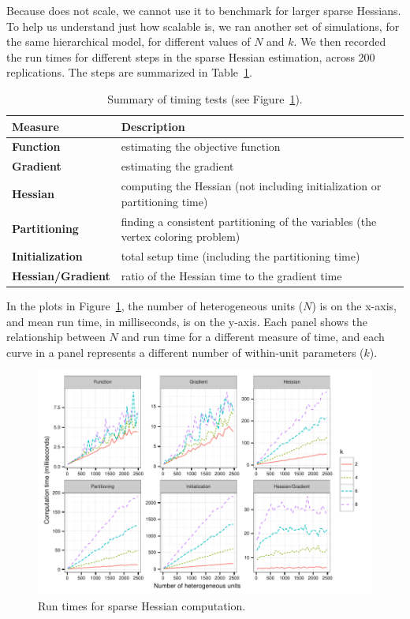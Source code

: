 \documentclass[article]{jss}\usepackage[]{graphicx}\usepackage[]{color}
\begin{document}
Because  does not scale, we cannot use it to benchmark  for
larger sparse Hessians.  To help us understand just how scalable
 is, we ran another set of simulations, for the
same hierarchical model, for different values of $N$ and $k$.  We then
recorded the run times for different steps in the sparse Hessian
estimation, across 200 replications.  The steps are summarized in Table~\ref{tab:timeMeasures}.

\begin{table}[ptb]\centering
  \begin{tabularx}{1.0\linewidth}{>{\bfseries}l X}
    \toprule
    Measure&Description\\
    \midrule
Function&estimating the objective function\\
Gradient&estimating the gradient\\
Hessian&computing the Hessian (not including initialization or
  partitioning time)\\
Partitioning&finding a consistent partitioning of the
  variables (the vertex coloring problem)\\
Initialization&total setup time (including the partitioning time)\\
Hessian/Gradient&ratio of the Hessian time to the
    gradient time\\
    \bottomrule
  \end{tabularx}
  \caption{Summary of timing tests (see Figure~\ref{fig:timing}).}\label{tab:timeMeasures}
\end{table}

In the plots in Figure~\ref{fig:timing}, the number of heterogeneous units ($N$) is
on the x-axis, and mean run time, in milliseconds, is on the y-axis.  Each panel shows the
relationship between $N$ and run time for a different measure of time,
and each curve in a panel represents a different number of within-unit
parameters ($k$).

\begin{figure}[tbp]
  \centering
\includegraphics{fig_timings}
  \caption{Run times for sparse Hessian computation.}
  \label{fig:timing}
\end{figure}
\end{document}
